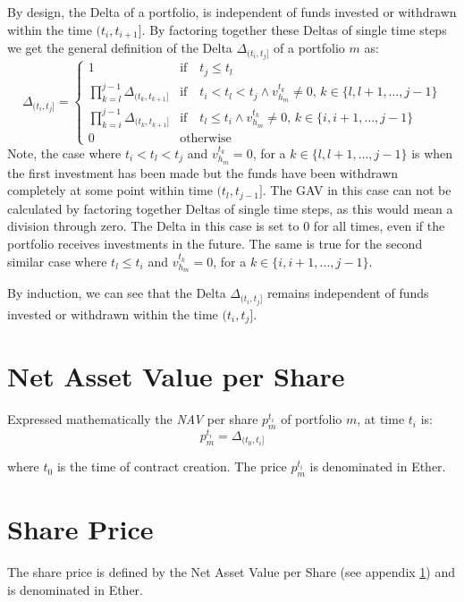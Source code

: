 \documentclass[9pt,oneside]{amsart}
\theoremstyle{plain}
\begin{document}
By design, the Delta of a portfolio, is independent of funds invested or withdrawn within the time $(t_i, t_{i+1}]$. By factoring together these Deltas of single time steps we get the general definition of the Delta $\Delta_{(t_i, t_j]}$ of a portfolio $m$ as:
\begin{equation}
	\Delta_{(t_i, t_j]} = \begin{cases}
		1 & \text{if} \quad t_j \leq t_l \\
		\prod\limits_{k = l}^{j - 1} \Delta_{(t_k, t_{k + 1}]} & \text{if} \quad t_i < t_l < t_j \wedge  v_{h_m}^{t_k} \neq 0, \, k \in \{l, l + 1, \hdots, j - 1\}\\
		\prod\limits_{k = i}^{j - 1} \Delta_{(t_k, t_{k + 1}]} & \text{if} \quad t_l \leq t_i \wedge  v_{h_m}^{t_k} \neq 0, \, k \in \{i, i + 1, \hdots, j - 1\}\\
		0 & \text{otherwise}
	\end{cases}
\end{equation}
Note, the case where $t_i < t_l < t_j$ and $v_{h_m}^{t_k} = 0$, for a $k \in \{l, l + 1, \hdots, j - 1\}$ is when the first investment has been made but the funds have been withdrawn completely at some point within time $(t_l, t_{j-1}]$. The GAV in this case can not be calculated by factoring together Deltas of single time steps, as this would mean a division through zero. The Delta in this case is set to $0$ for all times, even if the portfolio receives investments in the future. The same is true for the second similar case where $t_l \leq t_i$ and $v_{h_m}^{t_k} = 0$, for a $k \in \{i, i + 1, \hdots, j - 1\}$.

By induction, we can see that the Delta $\Delta_{(t_i, t_j]}$ remains independent of funds invested or withdrawn within the time $(t_i, t_j]$.

\section{Net Asset Value per Share}\label{app:defnavps}

Expressed mathematically the \textit{NAV} per share $p_{m}^{t_i}$  of portfolio $m$, at time $t_i$ is:
\begin{equation}
	p_{m}^{t_i} = \Delta_{(t_0, t_i]}
\end{equation}

where $t_0$ is the time of contract creation. The price $p_{m}^{t_i}$ is denominated in Ether. 

\section{Share Price}\label{app:defshareprice}

The share price is defined by the Net Asset Value per Share (see appendix \ref{app:defnavps}) and is denominated in Ether.
	
\end{document}
